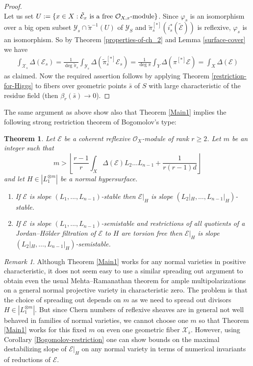 \documentclass[12pt]{article}
\theoremstyle{plain}
\newtheorem{Theorem}[Thm]{\sc Theorem}
\theoremstyle{definition}
\theoremstyle{remark}
\newtheorem{Remark}[Thm]{Remark}
\newcommand{\cE}{{\mathcal E}}
\newcommand{\cO}{{\mathcal O}}
\newcommand{\cX}{{\mathcal X}}
\newcommand{\cY}{{\mathcal Y}}
\begin{document}
\begin{proof}
$${ }$$
Let us set $U:=\{x\in X: \tilde \cE _x\hbox{ is a free $\cO_{X,x}$-module}\}$.
Since $\varphi_s$ is an isomorphism over a big open subset 
$\cY_s \cap \tilde \pi^{-1}( U)$ 
of $\cY_S$ and $\tilde \pi_s^{[*]} (i_s^*(\tilde \cE))$ is reflexive, $\varphi _s$ is an isomorphism.
So by Theorem \ref{properties-of-ch_2}  and Lemma \ref{surface-cover} we have
\begin{align*}
		\int_{\cX_s}\Delta (\cE _s)=\frac {1}{\deg \tilde \pi_s} \int_{\cY_s}\Delta (\tilde \pi_s^{[*]}\cE _s)=
\frac {1}{\deg \pi} \int_Y\Delta (\pi^{[*]}\cE)= 	\int_X\Delta (\cE)
\end{align*}
as claimed.
Now the required assertion follows by  applying Theorem \ref{restriction-for-Higgs} to fibers over geometric points $\bar s$ of $S$ with large characteristic of the residue field (then $\beta _r (\bar s)\to 0$).
\end{proof}

\medskip

The same argument as above show also that Theorem \ref{Main1} implies
the following strong restriction theorem of Bogomolov's type:

\begin{Theorem}\label{Mehta-Ramanathan}
	Let  $\cE$ be a coherent reflexive $\cO_X$-module of rank $r\ge 2$. Let  $m$ be an integer such that
	$$m>\left\lfloor \frac{r-1}{ r}\int_X\Delta (\cE)L_2\dots L_{n-1} +\frac{1}{r(r-1)d}
\right\rfloor $$
and let $H\in |L_1^{\otimes m}|$  be a normal hypersurface. \begin{enumerate}
	\item 
	If $\cE$ is slope $(L_1,...,L_{n-1})$-stable 	then $\cE|_H$ is  slope $(L_2|_H,\dots ,L_{n-1}|_H)$-stable.
	\item If $\cE$ is slope $(L_1,...,L_{n-1})$-semistable 	and restrictions of all quotients of a Jordan--H\"older filtration of $\cE$ to $H$ are torsion free	then $\cE|_H$ is  slope $(L_2|_H,\dots ,L_{n-1}|_H)$-semistable. 
\end{enumerate}	
\end{Theorem}

\begin{Remark}
Although Theorem \ref{Main1} works for any normal varieties in positive characteristic, it does not seem easy to use a similar spreading out argument to obtain even the usual Mehta--Ramanathan theorem for ample multipolarizations on a general normal projective variety in characteristic zero.
The problem is that the choice of spreading out depends on $m$ as we need to
spread out divisors  $H\in |L_1^{\otimes m}|$. But since Chern numbers of reflexive sheaves are in general not well behaved in families of normal varieties, we cannot choose one $m$ so that Theorem \ref{Main1} works for this fixed $m$ on even one geometric fiber $\cX_{\bar s}$.
However, using Corollary \ref{Bogomolov-restriction} one can show bounds on the maximal destabilizing slope of $\cE|_H$ on any normal variety in terms of numerical invariants of reductions of $\cE$.
\end{Remark}
\end{document}
